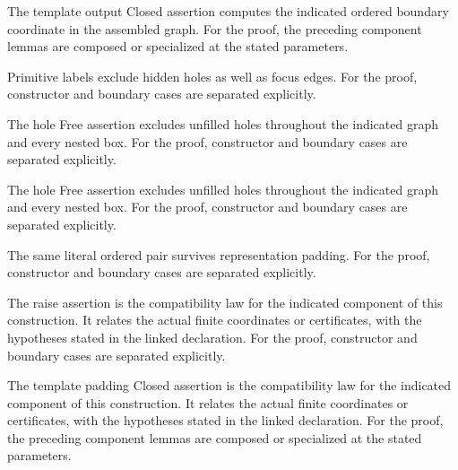 The template output Closed assertion computes the indicated ordered boundary coordinate in the assembled graph.
For the proof, the preceding component lemmas are composed or specialized at the stated parameters.
\par{}

Primitive labels exclude hidden holes as well as focus edges.
For the proof, constructor and boundary cases are separated explicitly.
\par{}

The hole Free assertion excludes unfilled holes throughout the indicated graph and every nested box.
For the proof, constructor and boundary cases are separated explicitly.
\par{}

The hole Free assertion excludes unfilled holes throughout the indicated graph and every nested box.
For the proof, constructor and boundary cases are separated explicitly.
\par{}

The same literal ordered pair survives representation padding.
For the proof, constructor and boundary cases are separated explicitly.
\par{}

The raise assertion is the compatibility law for the indicated component of this construction. It relates the actual finite coordinates or certificates, with the hypotheses stated in the linked declaration.
For the proof, constructor and boundary cases are separated explicitly.
\par{}

The template padding Closed assertion is the compatibility law for the indicated component of this construction. It relates the actual finite coordinates or certificates, with the hypotheses stated in the linked declaration.
For the proof, the preceding component lemmas are composed or specialized at the stated parameters.
\par{}

